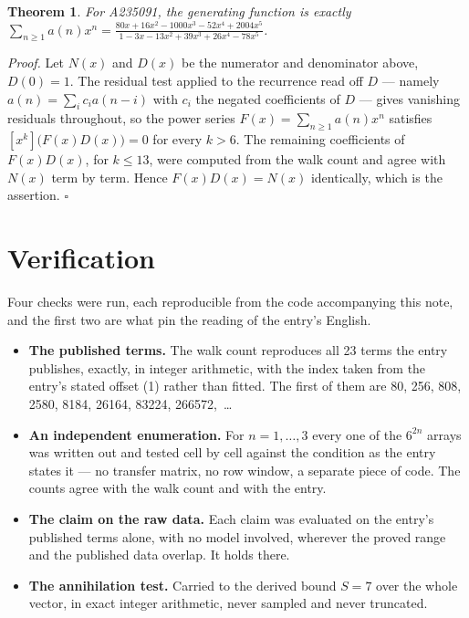 \documentclass[11pt]{article}
\newtheorem{theorem}{Theorem}
\theoremstyle{definition}
\begin{document}
\begin{theorem} For A235091, the generating function is exactly $\sum_{n\ge 1} a(n)x^n = \frac{80x + 16x^{2} - 1000x^{3} - 52x^{4} + 2004x^{5}}{1 - 3x - 13x^{2} + 39x^{3} + 26x^{4} - 78x^{5}}$.\end{theorem}

{\itshape Proof.} Let $N(x)$ and $D(x)$ be the numerator and denominator above, $D(0)=1$. The residual test applied to the recurrence read off $D$ --- namely $a(n) = \sum_i c_i a(n-i)$ with $c_i$ the negated coefficients of $D$ --- gives vanishing residuals throughout, so the power series $F(x)=\sum_{n\ge 1}a(n)x^n$ satisfies $[x^k]\bigl(F(x)D(x)\bigr) = 0$ for every $k > 6$. The remaining coefficients of $F(x)D(x)$, for $k \le 13$, were computed from the walk count and agree with $N(x)$ term by term. Hence $F(x)D(x) = N(x)$ identically, which is the assertion. $\square$

\section{Verification}

Four checks were run, each reproducible from the code accompanying this note, and the first two are what pin the reading of the entry's English.

\begin{itemize}

\item {\bfseries The published terms.} The walk count reproduces all 23 terms the entry publishes, exactly, in integer arithmetic, with the index taken from the entry's stated offset (1) rather than fitted. The first of them are 80, 256, 808, 2580, 8184, 26164, 83224, 266572,~\dots

\item {\bfseries An independent enumeration.} For $n = 1,\dots,3$ every one of the $6^{2n}$ arrays was written out and tested cell by cell against the condition as the entry states it --- no transfer matrix, no row window, a separate piece of code. The counts agree with the walk count and with the entry.

\item {\bfseries The claim on the raw data.} Each claim was evaluated on the entry's published terms alone, with no model involved, wherever the proved range and the published data overlap. It holds there.

\item {\bfseries The annihilation test.} Carried to the derived bound $S = 7$ over the whole vector, in exact integer arithmetic, never sampled and never truncated.

\end{itemize}
\end{document}
